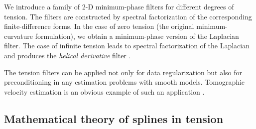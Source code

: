 We introduce a family of 2-D
minimum-phase filters for different degrees of tension.  The filters
are constructed by spectral factorization of the corresponding
finite-difference forms. In the case of zero tension (the original
minimum-curvature formulation), we obtain a minimum-phase version of
the Laplacian filter. The case of infinite tension leads to spectral
factorization of the Laplacian and produces the \emph{helical
  derivative} filter \cite{iee}.
\par
The tension filters can be applied not only for data regularization
but also for preconditioning in any estimation problems with smooth
models. Tomographic velocity estimation is an obvious example of such
an application \cite{SEG-1998-1218}.

\subsection{Mathematical theory of splines in tension}

